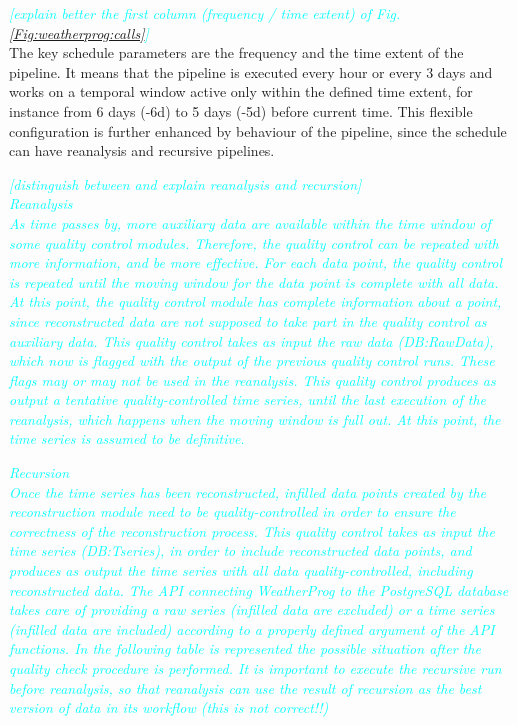 \documentclass[authoryear,preprint,review,12pt]{elsarticle}
\newcommand{\review}[1]{\emph{\textcolor{cyan}{#1}}}
\begin{document}
\review{ [explain better the first column (frequency / time extent) of Fig. \ref{Fig:weatherprog:calls}] }\\
The key schedule parameters are the frequency and the time extent of the pipeline. It means that the pipeline is executed every hour or every 3 days and works on a temporal window active only within the defined time extent, for instance from 6 days (-6d) to 5 days (-5d) before current time.
This flexible configuration is further enhanced by behaviour of the pipeline, since the schedule can have reanalysis and recursive pipelines.

\review{ [distinguish between and explain reanalysis and recursion] }\\
\review{
Reanalysis\\
As time passes by, more auxiliary data are available within the time window of some quality control modules.
Therefore, the quality control can be repeated with more information, and be more effective.
For each data point, the quality control is repeated until the moving window for the data point is complete with all data.
At this point, the quality control module has complete information about a point, since reconstructed data are not supposed to take part in the quality control as auxiliary data. 
This quality control takes as input the raw data (DB:RawData), which now is flagged with the output of the previous quality control runs.
These flags may or may not be used in the reanalysis.
This quality control produces as output a tentative quality-controlled time series, until the last execution of the reanalysis, which happens when the moving window is full out.
At this point, the time series is assumed to be definitive. 
}

\review{
Recursion\\
Once the time series has been reconstructed, infilled data points created by the reconstruction module need to be quality-controlled in order to ensure the correctness of the reconstruction process. 
This quality control takes as input the time series (DB:Tseries), in order to include reconstructed data points, and produces as output the time series with all data quality-controlled, including reconstructed data. The API connecting WeatherProg to the PostgreSQL database takes care of providing a raw series (infilled data are excluded) or a time series (infilled data are included) according to a properly defined argument of the API functions. 
In the following table is represented the possible situation after the quality check procedure is performed. 
It is important to execute the recursive run before reanalysis, so that reanalysis can use the result of recursion as the best version of data in its workflow (this is not correct!!)
}
\end{document}

